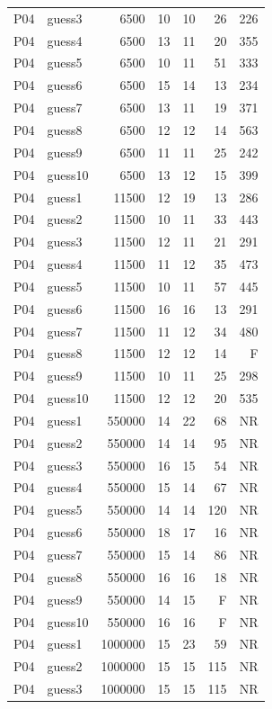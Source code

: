 {\begin{longtable}{llrrrrr}
P04 & guess3 & 6500 & 10 & 10 & 26 & 226 \\
P04 & guess4 & 6500 & 13 & 11 & 20 & 355 \\
P04 & guess5 & 6500 & 10 & 11 & 51 & 333 \\
P04 & guess6 & 6500 & 15 & 14 & 13 & 234 \\
P04 & guess7 & 6500 & 13 & 11 & 19 & 371 \\
P04 & guess8 & 6500 & 12 & 12 & 14 & 563 \\
P04 & guess9 & 6500 & 11 & 11 & 25 & 242 \\
P04 & guess10 & 6500 & 13 & 12 & 15 & 399 \\
P04 & guess1 & 11500 & 12 & 19 & 13 & 286 \\
P04 & guess2 & 11500 & 10 & 11 & 33 & 443 \\
P04 & guess3 & 11500 & 12 & 11 & 21 & 291 \\
P04 & guess4 & 11500 & 11 & 12 & 35 & 473 \\
P04 & guess5 & 11500 & 10 & 11 & 57 & 445 \\
P04 & guess6 & 11500 & 16 & 16 & 13 & 291 \\
P04 & guess7 & 11500 & 11 & 12 & 34 & 480 \\
P04 & guess8 & 11500 & 12 & 12 & 14 & F \\
P04 & guess9 & 11500 & 10 & 11 & 25 & 298 \\
P04 & guess10 & 11500 & 12 & 12 & 20 & 535 \\
P04 & guess1 & 550000 & 14 & 22 & 68 & NR \\
P04 & guess2 & 550000 & 14 & 14 & 95 & NR \\
P04 & guess3 & 550000 & 16 & 15 & 54 & NR \\
P04 & guess4 & 550000 & 15 & 14 & 67 & NR \\
P04 & guess5 & 550000 & 14 & 14 & 120 & NR \\
P04 & guess6 & 550000 & 18 & 17 & 16 & NR \\
P04 & guess7 & 550000 & 15 & 14 & 86 & NR \\
P04 & guess8 & 550000 & 16 & 16 & 18 & NR \\
P04 & guess9 & 550000 & 14 & 15 & F & NR \\
P04 & guess10 & 550000 & 16 & 16 & F & NR \\
P04 & guess1 & 1000000 & 15 & 23 & 59 & NR \\
P04 & guess2 & 1000000 & 15 & 15 & 115 & NR \\
P04 & guess3 & 1000000 & 15 & 15 & 115 & NR \\

\end{longtable}}
